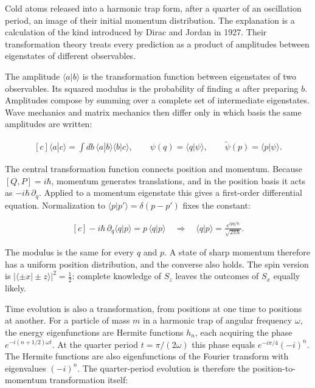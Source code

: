 \documentclass[11pt,oneside]{book}
\newenvironment{centeredalign}{\[\begin{gathered}[c]}{\end{gathered}\]}
\begin{document}
\label{topic:transformation-theory-quantum-mechanics}

Cold atoms released into a harmonic trap form, after a quarter of an oscillation period, an image of their initial momentum distribution. The explanation is a calculation of the kind introduced by Dirac and Jordan in 1927. Their transformation theory treats every prediction as a product of amplitudes between eigenstates of different observables.

The amplitude \(\langle a|b\rangle\) is the transformation function between eigenstates of two observables. Its squared modulus is the probability of finding \(a\) after preparing \(b\). Amplitudes compose by summing over a complete set of intermediate eigenstates. Wave mechanics and matrix mechanics then differ only in which basis the same amplitudes are written:

\begin{centeredalign}
\langle a|c\rangle=\int db\,\langle a|b\rangle\langle b|c\rangle,\qquad
\psi(q)=\langle q|\psi\rangle,\qquad \widetilde\psi(p)=\langle p|\psi\rangle.
\end{centeredalign}

The central transformation function connects position and momentum. Because \([Q,P]=i\hbar\), momentum generates translations, and in the position basis it acts as \(-i\hbar\,\partial_q\). Applied to a momentum eigenstate this gives a first-order differential equation. Normalization to \(\langle p|p'\rangle=\delta(p-p')\) fixes the constant:

\begin{centeredalign}
-i\hbar\,\partial_q\langle q|p\rangle=p\,\langle q|p\rangle
\quad\Longrightarrow\quad
\langle q|p\rangle=\frac{e^{ipq/\hbar}}{\sqrt{2\pi\hbar}}.
\end{centeredalign}

The modulus is the same for every \(q\) and \(p\). A state of sharp momentum therefore has a uniform position distribution, and the converse also holds. The spin version is \(|\langle{\pm}x|{\pm}z\rangle|^2=\tfrac12\): complete knowledge of \(S_z\) leaves the outcomes of \(S_x\) equally likely.

Time evolution is also a transformation, from positions at one time to positions at another. For a particle of mass \(m\) in a harmonic trap of angular frequency \(\omega\), the energy eigenfunctions are Hermite functions \(h_n\), each acquiring the phase \(e^{-i(n+1/2)\omega t}\). At the quarter period \(t=\pi/(2\omega)\) this phase equals \(e^{-i\pi/4}(-i)^n\). The Hermite functions are also eigenfunctions of the Fourier transform with eigenvalues \((-i)^n\). The quarter-period evolution is therefore the position-to-momentum transformation itself:
\end{document}
